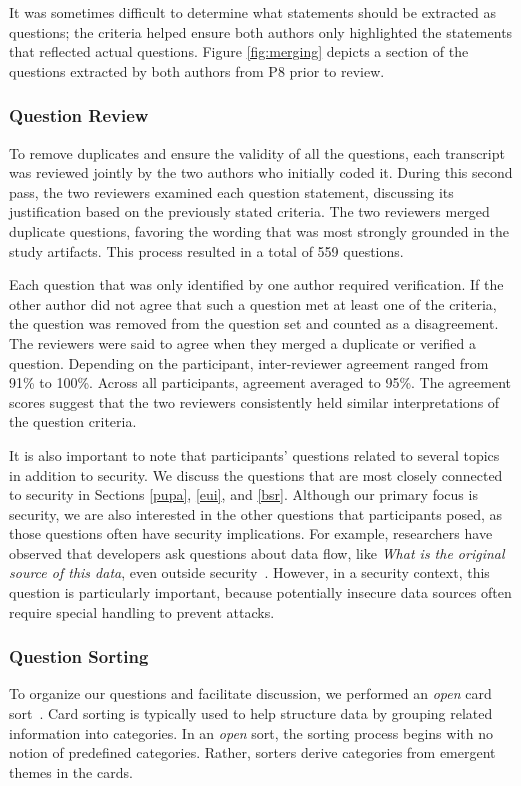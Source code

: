 \documentclass{sig-alternate}
\begin{document}
It was sometimes difficult to determine what statements should be extracted as questions; the criteria helped ensure both authors only highlighted the statements that reflected actual questions. 
Figure \ref{fig:merging} depicts a section of the questions extracted by both authors from P8 prior to review.


\subsubsection{Question Review}
To remove duplicates and ensure the validity of all the questions, each transcript was reviewed jointly by the two authors who initially coded it.
During this second pass, the two reviewers examined each question statement, discussing its justification based on the previously stated criteria.
The two reviewers merged duplicate questions, favoring the wording that was most strongly grounded in the study artifacts.
This process resulted in a total of 559 questions.

Each question that was only identified by one author required verification.
If the other author did not agree that such a question met at least one of the criteria, the question was removed from the question set and counted as a disagreement.
The reviewers were said to agree when they merged a duplicate or verified a question. Depending on the participant, inter-reviewer agreement ranged from 91\% to 100\%. Across all participants, agreement averaged to 95\%.
The agreement scores suggest that the two reviewers consistently held similar interpretations of the question criteria.

It is also important to note that participants' questions related to several topics in addition to security. 
We discuss the questions that are most closely connected to security in Sections \ref{pupa}, \ref{eui}, and \ref{bsr}.
Although our primary focus is security, we are also interested in the other questions that participants posed, as those questions often have security implications.
For example, researchers have observed that developers ask questions about data flow, like \emph{What is the original source of this data}, even outside security~\cite{latoza2010hard}.
However, in a security context, this question is particularly important, because potentially insecure data sources often require special handling to prevent attacks.


\subsubsection{Question Sorting}
To organize our questions and facilitate discussion, we performed an \textit{open} card sort~\cite{hudson2013sorting}. 
Card sorting is typically used to help structure data by grouping related information into categories. 
In an \textit{open} sort, the sorting process begins with no notion of predefined categories. 
Rather, sorters derive categories from emergent themes in the cards. 
\end{document}
